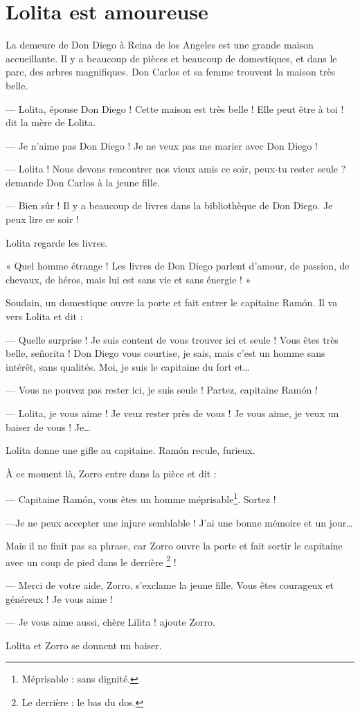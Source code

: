 \chapter{Lolita est amoureuse}
La demeure de Don Diego à Reina de los Angeles est une grande maison accueillante. Il y a beaucoup de pièces et beaucoup de
domestiques, et dans le parc, des arbres magnifiques. Don Carlos et sa femme trouvent la maison très belle.

--- Lolita, épouse Don Diego ! Cette maison est très belle ! Elle peut être à toi ! dit la mère de Lolita.

--- Je n'aime pas Don Diego ! Je ne veux pas me marier avec Don Diego !

--- Lolita ! Nous devons rencontrer nos vieux amis ce soir, peux-tu rester seule ? demande Don Carlos à la jeune fille.

--- Bien sûr ! Il y a beaucoup de livres dans la bibliothèque de Don Diego. Je peux lire ce soir !

Lolita regarde les livres.

« Quel homme étrange ! Les livres de Don Diego parlent d'amour, de passion, de chevaux, de héros, mais lui est sans vie et sans
énergie ! »

Soudain, un domestique ouvre la porte et fait entrer le capitaine Ramón. Il va vers Lolita et dit :

--- Quelle surprise ! Je suis content de vous trouver ici et seule ! Vous êtes très belle, señorita ! Don Diego vous courtise, je
    sais, mais c'est un homme sans intérêt, sans qualités. Moi, je suis le capitaine du fort et\ldots{}

--- Vous ne pouvez pas rester ici, je suis seule ! Partez, capitaine Ramón !

--- Lolita, je vous aime ! Je veuz rester près de vous ! Je vous aime, je veux un baiser de vous ! Je\ldots{}

Lolita donne une gifle au capitaine. Ramón recule, furieux.

À ce moment là, Zorro entre dans la pièce et dit :

--- Capitaine Ramón, vous êtes un homme méprisable\footnote{Méprisable : sans dignité.}. Sortez !

---Je ne peux accepter une injure semblable ! J'ai une bonne mémoire et un jour\ldots{}

Mais il ne finit pas sa phrase, car Zorro ouvre la porte et fait sortir le capitaine avec un coup de pied dans le derrière
\footnote{Le derrière : le bas du dos.} !

--- Merci de votre aide, Zorro, s'exclame la jeune fille. Vous êtes courageux et généreux ! Je vous aime !

--- Je vous aime aussi, chère Lilita ! ajoute Zorro.

Lolita et Zorro se donnent un baiser.
